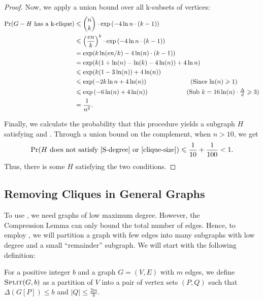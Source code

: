 \documentclass[11pt]{article}
\begin{document}
\begin{proof}
    Now, we apply a union bound over all k-subsets of vertices:
    \begin{align*}
        \Pr(G-H\text{ has a k-clique})&\le \binom nk\cdot \exp\left(-4\ln n\cdot (k-1)\right)\\
        &\le {\left(\frac{en}k\right)}^k \cdot \exp\left(-4\ln n\cdot (k-1)\right)\\
        &=\exp(k\ln(en/k)-4\ln(n)\cdot (k-1))\\
        &=\exp(k(1+\ln(n)-\ln(k)-4\ln(n)) + 4\ln n)\\
        &\le \exp(k(1-3\ln(n))+4\ln(n))\\
        &\le \exp(-2k\ln n + 4\ln(n))\hspace{5em}\tag{Since $\ln(n)\ge1$}\\
        &\le \exp\left(-6\ln(n)+4\ln(n)\right)\hspace{4em}\tag{Sub $k=16\ln(n)\cdot \frac{\Delta}d\ge3$}\\
        &=\frac 1{n^2}.
    \end{align*}

    Finally, we calculate the probability that this procedure yields a subgraph $H$ satisfying  and . Through a union bound on the complement, when $n>10$, we get
    \begin{align*}
        \Pr(H\text{ does not satisfy \Cref{S-degree} or \Cref{clique-size}})\le \frac1{10}+\frac1{100}<1.
    \end{align*} 
    Thus, there is some $H$ satisfying the two conditions. 
\end{proof}

\subsection{Removing Cliques in General Graphs}
\noindent
To use , we need graphs of low maximum degree. However, the $\hyperref[compression]{\text{Compression Lemma}}$ can only bound the total number of edges. Hence, to employ , we will partition a graph with few edges into many subgraphs with low degree and a small ``remainder'' subgraph. We will start with the following definition:

\newcommand{\graphSplit}{\textnormal{\textsc{Split}}}

\begin{definition}
    For a positive integer $b$ and a graph $G=(V, E)$ with $m$ edges, we define $\graphSplit(G, b)$ as a partition of $V$ into a pair of vertex sets $(P, Q)$ such that $\Delta{(G[P])}\le b$ and $|Q|\le \frac{2m}b$.
\end{definition}
\end{document}
